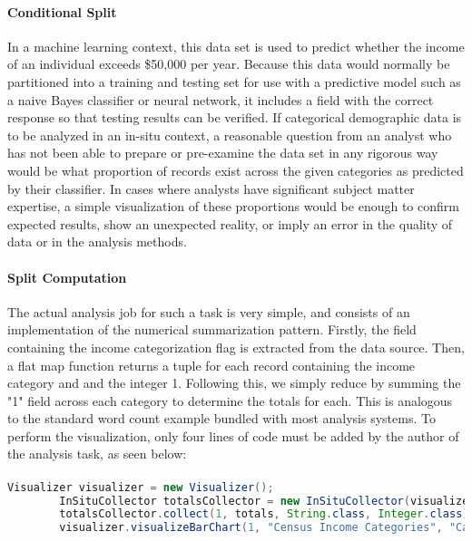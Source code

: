 \paragraph{Conditional Split}
In a machine learning context, this data set is used to predict whether the income of an individual exceeds \$50,000 per year. Because this data would normally be partitioned into a training and testing set for use with a predictive model such as a naive Bayes classifier or neural network, it includes a field with the correct response so that testing results can be verified. If categorical demographic data is to be analyzed in an in-situ context, a reasonable question from an analyst who has not been able to prepare or pre-examine the data set in any rigorous way would be what proportion of records exist across the given categories as predicted by their classifier. In cases where analysts have significant subject matter expertise, a simple visualization of these proportions would be enough to confirm expected results, show an unexpected reality, or imply an error in the quality of data or in the analysis methods.

\paragraph{Split Computation}
The actual analysis job for such a task is very simple, and consists of an implementation of the numerical summarization pattern. Firstly, the field containing the income categorization flag is extracted from the data source. Then, a flat map function returns a tuple for each record containing the income category and and the integer 1. Following this, we simply reduce by summing the "1" field across each category to determine the totals for each. This is analogous to the standard word count example bundled with most analysis systems. To perform the visualization, only four lines of code must be added by the author of the analysis task, as seen below:

\paragraph{}
\begin{lstlisting}[language=Java,showspaces=false,showstringspaces=false,breaklines=true, breakatwhitespace=true]
        Visualizer visualizer = new Visualizer();
        InSituCollector totalsCollector = new InSituCollector(visualizer);
        totalsCollector.collect(1, totals, String.class, Integer.class);
        visualizer.visualizeBarChart(1, "Census Income Categories", "Category", "Count");
\end{lstlisting}

